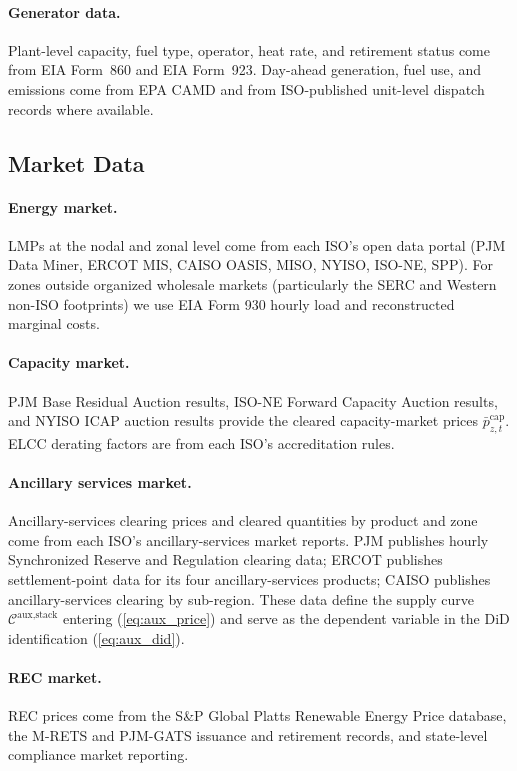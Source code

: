 \documentclass[12pt,letterpaper]{article}
\begin{document}
\paragraph{Generator data.} Plant-level capacity, fuel type, operator,
heat rate, and retirement status come from EIA Form~860 and EIA Form~923.
Day-ahead generation, fuel use, and emissions come from EPA CAMD
\citep{EPA_CAPMD_PowerSector2022} and from ISO-published unit-level
dispatch records where available.

\subsection{Market Data}

\paragraph{Energy market.} LMPs at the nodal and zonal level come from each
ISO's open data portal (PJM Data Miner, ERCOT MIS, CAISO OASIS, MISO,
NYISO, ISO-NE, SPP). For zones outside organized wholesale markets
(particularly the SERC and Western non-ISO footprints) we use EIA Form 930
hourly load and reconstructed marginal costs.

\paragraph{Capacity market.} PJM Base Residual Auction results, ISO-NE
Forward Capacity Auction results, and NYISO ICAP auction results provide
the cleared capacity-market prices $\bar p^{\text{cap}}_{z,t}$. ELCC
derating factors are from each ISO's accreditation rules.

\paragraph{Ancillary services market.} Ancillary-services clearing prices
and cleared quantities by product and zone come from each ISO's
ancillary-services market reports. PJM publishes hourly Synchronized
Reserve and Regulation clearing data; ERCOT publishes settlement-point
data for its four ancillary-services products; CAISO publishes
ancillary-services clearing by sub-region. These data define the supply
curve $\mathcal{C}^{\text{aux,stack}}$ entering (\ref{eq:aux_price}) and
serve as the dependent variable in the DiD identification
(\ref{eq:aux_did}).

\paragraph{REC market.} REC prices come from the S\&P Global Platts
Renewable Energy Price database, the M-RETS and PJM-GATS issuance and
retirement records, and state-level compliance market reporting.
\end{document}
